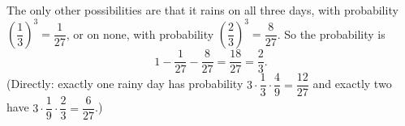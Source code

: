 The only other possibilities are that it rains on all three days, with probability $\left(\dfrac13\right)^3=\dfrac1{27}$, or on none, with probability $\left(\dfrac23\right)^3=\dfrac8{27}$. So the probability is
\[1-\dfrac1{27}-\dfrac8{27}=\dfrac{18}{27}=\boxed{\dfrac23}.\]
(Directly: exactly one rainy day has probability $3\cdot\dfrac13\cdot\dfrac49=\dfrac{12}{27}$ and exactly two have $3\cdot\dfrac19\cdot\dfrac23=\dfrac{6}{27}$.)
